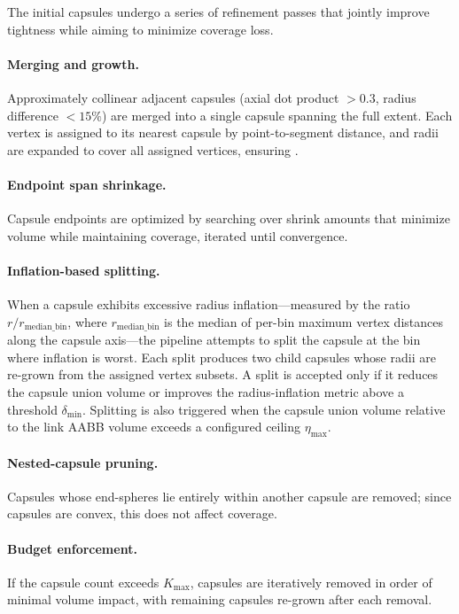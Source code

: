 The initial capsules undergo a series of refinement passes that jointly improve tightness while aiming to minimize coverage loss.

\paragraph{Merging and growth.}
Approximately collinear adjacent capsules (axial dot product $> 0.3$, radius difference $< 15\%$) are merged into a single capsule spanning the full extent. Each vertex is assigned to its nearest capsule by point-to-segment distance, and radii are expanded to cover all assigned vertices, ensuring .

\paragraph{Endpoint span shrinkage.}
Capsule endpoints are optimized by searching over shrink amounts that minimize volume while maintaining coverage, iterated until convergence.

\paragraph{Inflation-based splitting.}
When a capsule exhibits excessive radius inflation---measured by the ratio $r / r_{\text{median\_bin}}$, where $r_{\text{median\_bin}}$ is the median of per-bin maximum vertex distances along the capsule axis---the pipeline attempts to split the capsule at the bin where inflation is worst.
Each split produces two child capsules whose radii are re-grown from the assigned vertex subsets.
A split is accepted only if it reduces the capsule union volume or improves the radius-inflation metric above a threshold $\delta_{\min}$.
Splitting is also triggered when the capsule union volume relative to the link AABB volume exceeds a configured ceiling $\eta_{\max}$.

\paragraph{Nested-capsule pruning.}
Capsules whose end-spheres lie entirely within another capsule are removed; since capsules are convex, this does not affect coverage.

\paragraph{Budget enforcement.}
If the capsule count exceeds $K_{\max}$, capsules are iteratively removed in order of minimal volume impact, with remaining capsules re-grown after each removal.

